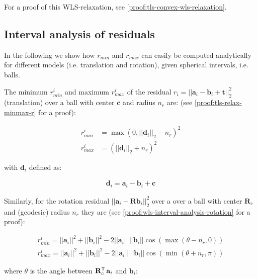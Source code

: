 For a proof of this WLS-relaxation, see \ref{proof:tls-convex-wls-relaxation}.

\subsection{Interval analysis of residuals}

In the following we show how $r_{min}$ and $r_{max}$ can easily be computed analytically for different models (i.e. translation and rotation), given spherical intervals, i.e. balls.

The minimum $r_{min}^i$ and maximum $r_{max}^i$ of the residual $r_i =||\mathbf{a}_i - \mathbf{b}_i + \mathbf{t}||_2^2$ (translation) over a ball with center $\mathbf{c}$ and radius $n_r$ are: (see \ref{proof:tls-relax-minmax-r} for a proof):

\begin{equation}
	\begin{aligned}	
		r_{min}^i &= \max(0, ||\mathbf{d}_i||_2 - n_r)^2\\
		r_{max}^i &= (||\mathbf{d}_i||_2 + n_r)^2
	\end{aligned}
\end{equation}

with $\mathbf{d}_i$ defined as: 

\begin{equation}
	\begin{aligned}	
		\mathbf{d}_i = \mathbf{a}_i - \mathbf{b}_i + \mathbf{c}
	\end{aligned}
\end{equation}

Similarly, for the rotation residual $||\mathbf{a}_i - \mathbf{R}\mathbf{b}_i ||_2^2$ over a over a ball with center $\mathbf{R}_c$ and (geodesic) radius $n_r$ they are (see \ref{proof:wls-interval-analysis-rotation} for a proof): 

\begin{equation}
	\label{eq:residual-minmax-rotation}
	\begin{aligned}
		r_{min}^i = ||\mathbf{a}_i||^2 + ||\mathbf{b}_i||^2 - 2 ||\mathbf{a}_i|| \, ||\mathbf{b}_i|| \cos (\max(\theta - n_r, 0))\\
		r_{max}^i = ||\mathbf{a}_i||^2 + ||\mathbf{b}_i||^2 - 2 ||\mathbf{a}_i|| \, ||\mathbf{b}_i|| \cos (\min(\theta + n_r, \pi))
	\end{aligned}
\end{equation}

where $\theta$ is the angle between $\mathbf{R}_c^{\mathsf{T}} \,\mathbf{a}_i$ and $\mathbf{b}_i$:

